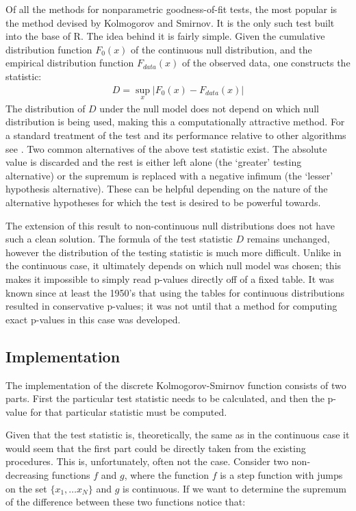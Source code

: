 Of all the methods for nonparametric goodness-of-fit tests, the most popular is the method devised by Kolmogorov and Smirnov.
It is the only such test built into the base of R. The idea behind it is fairly simple. Given the cumulative distribution
function $F_0(x)$ of the continuous null distribution, and the empirical distribution function $F_{data}(x)$ of the observed data, 
one constructs the statistic:
\begin{align}
D = \sup_x \left| F_0(x)- F_{data}(x) \right|
\end{align}
The distribution of $D$ under the null model does not depend on which null distribution is being used, making this a computationally
attractive method. For a standard treatment of the test and its performance relative to other algorithms see \cite{slakter65}. Two common
alternatives of the above test statistic exist. The absolute value is discarded and the rest is either left alone (the `greater' testing 
alternative) or the supremum is replaced with a negative infimum (the `lesser' hypothesis alternative). These can be helpful depending 
on the nature of the alternative hypotheses for which the test is desired to be powerful towards.

The extension of this result to non-continuous null distributions does not have such a clean solution. The formula of
the test statistic $D$ remains unchanged, however the distribution of the testing statistic is much more difficult. Unlike in the 
continuous case, it ultimately depends on which null model was chosen; this makes it impossible to simply read p-values directly 
off of a fixed table. It was known since at least the 1950's that using the tables for continuous distributions resulted in 
conservative p-values; it was not until \citet{Conover1972} that a method for computing exact p-values in this case was developed.

\subsection{Implementation}

The implementation of the discrete Kolmogorov-Smirnov function consists of two parts. First the particular test statistic needs to be calculated,
and then the p-value for that particular statistic must be computed. 

Given that the test statistic is, theoretically, the same as in the
continuous case it would seem that the first part could be directly taken from the existing procedures. This is, unfortunately, often not the case.
Consider two non-decreasing functions $f$ and $g$, where the function $f$ is a step function with jumps on the set $\{x_1, \ldots x_N \}$ and $g$
is continuous. If we want to determine the supremum of the difference between these two functions notice that:

